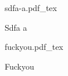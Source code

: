 \documentclass[AutoFakeBold,twoside]{article}
\newcommand{\incfig}[1]{%
    \def\svgwidth{\columnwidth}
    {#1.pdf_tex}
}
\begin{document}
\begin{figure}[ht]
    \centering
    \incfig{sdfa-a}
    \caption{Sdfa a}
    \label{fig:sdfa-a}
\end{figure}


\begin{figure}[ht]
    \centering
    \incfig{fuckyou}
    \caption{Fuckyou}
    \label{fig:fuckyou}
\end{figure}
\end{document}
